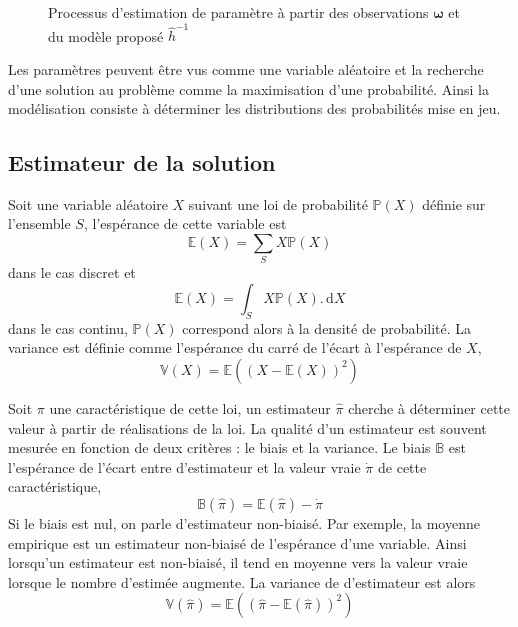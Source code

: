 \documentclass[../main/These_Mathias_Paget.tex]{subfiles}
\begin{document}
\begin{figure}[h]
\begin{center}
\end{center}
\caption{Processus d'estimation de paramètre à partir des observations $\boldsymbol{\omega}$ et du modèle proposé $\hat{h}^{-1}$}
\end{figure}

Les paramètres peuvent être vus comme une variable aléatoire et la recherche d'une solution au problème comme la maximisation d'une probabilité. Ainsi la modélisation consiste à déterminer les distributions des probabilités mise en jeu.

\subsection{Estimateur de la solution}

Soit une variable aléatoire $X$ suivant une loi de probabilité $\mathbb{P}(X)$ définie sur l'ensemble $S$, l'espérance de cette variable est
\begin{equation}
\mathbb{E}(X) = \sum_{S}{X\mathbb{P}(X)}
\end{equation}
dans le cas discret et
\begin{equation}
\mathbb{E}(X) = \int_{S}{X\mathbb{P}(X). \, \mathrm{d}X}
\end{equation}
dans le cas continu, $\mathbb{P}(X)$ correspond alors à la densité de probabilité. La variance est définie comme l'espérance du carré de l'écart à l'espérance de $X$,
\begin{equation}
\mathbb{V}(X) = \mathbb{E}( (X - \mathbb{E}(X))^2)
\end{equation}

Soit $\pi$ une caractéristique de cette loi, un estimateur $\hat{\pi}$ cherche à déterminer cette valeur à partir de réalisations de la loi. La qualité d'un estimateur est souvent mesurée en fonction de deux critères : le biais et la variance. Le biais $\mathbb{B}$ est l'espérance de l'écart entre d'estimateur et la valeur vraie $\dot{\pi}$ de cette caractéristique,
\begin{equation}
\mathbb{B}(\hat{\pi}) = \mathbb{E}(\hat{\pi}) - \dot{\pi}
\end{equation}
Si le biais est nul, on parle d'estimateur non-biaisé. Par exemple, la moyenne empirique est un estimateur non-biaisé de l'espérance d'une variable. Ainsi lorsqu'un estimateur est non-biaisé, il tend en moyenne vers la valeur vraie lorsque le nombre d'estimée augmente.
La variance de d'estimateur est alors
\begin{equation}
\mathbb{V}(\hat{\pi}) = \mathbb{E}( (\hat{\pi} - \mathbb{E}(\hat{\pi}))^2)
\end{equation}
\end{document}
